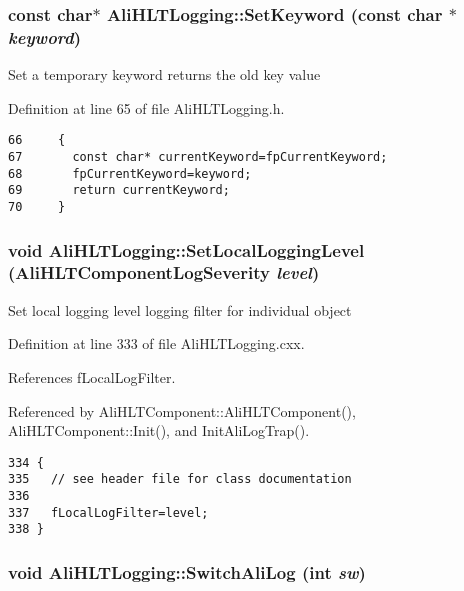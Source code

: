 \subsubsection{\setlength{\rightskip}{0pt plus 5cm}const char$\ast$ Ali\-HLTLogging::Set\-Keyword (const char $\ast$ {\em keyword})\hspace{0.3cm}{\tt  [inline]}}\label{classAliHLTLogging_a5}


Set a temporary keyword returns the old key value 

Definition at line 65 of file Ali\-HLTLogging.h.

\footnotesize\begin{verbatim}66     { 
67       const char* currentKeyword=fpCurrentKeyword;
68       fpCurrentKeyword=keyword;
69       return currentKeyword; 
70     }
\end{verbatim}\normalsize 


\subsubsection{\setlength{\rightskip}{0pt plus 5cm}void Ali\-HLTLogging::Set\-Local\-Logging\-Level ({\bf Ali\-HLTComponent\-Log\-Severity} {\em level})}\label{classAliHLTLogging_a10}


Set local logging level logging filter for individual object 

Definition at line 333 of file Ali\-HLTLogging.cxx.

References f\-Local\-Log\-Filter.

Referenced by Ali\-HLTComponent::Ali\-HLTComponent(), Ali\-HLTComponent::Init(), and Init\-Ali\-Log\-Trap().

\footnotesize\begin{verbatim}334 {
335   // see header file for class documentation
336 
337   fLocalLogFilter=level;
338 }
\end{verbatim}\normalsize 


\subsubsection{\setlength{\rightskip}{0pt plus 5cm}void Ali\-HLTLogging::Switch\-Ali\-Log (int {\em sw})\hspace{0.3cm}{\tt  [inline]}}\label{classAliHLTLogging_a13}



